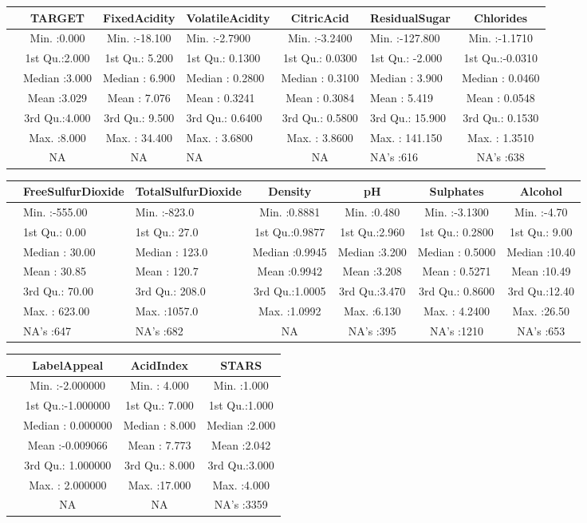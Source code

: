 \documentclass[]{article}
\begin{document}
\begin{longtable}[]{@{}lcclclc@{}}
\toprule
& TARGET & FixedAcidity & VolatileAcidity & CitricAcid & ResidualSugar &
Chlorides\tabularnewline
\midrule
\endhead
& Min. :0.000 & Min. :-18.100 & Min. :-2.7900 & Min. :-3.2400 & Min.
:-127.800 & Min. :-1.1710\tabularnewline
& 1st Qu.:2.000 & 1st Qu.: 5.200 & 1st Qu.: 0.1300 & 1st Qu.: 0.0300 &
1st Qu.: -2.000 & 1st Qu.:-0.0310\tabularnewline
& Median :3.000 & Median : 6.900 & Median : 0.2800 & Median : 0.3100 &
Median : 3.900 & Median : 0.0460\tabularnewline
& Mean :3.029 & Mean : 7.076 & Mean : 0.3241 & Mean : 0.3084 & Mean :
5.419 & Mean : 0.0548\tabularnewline
& 3rd Qu.:4.000 & 3rd Qu.: 9.500 & 3rd Qu.: 0.6400 & 3rd Qu.: 0.5800 &
3rd Qu.: 15.900 & 3rd Qu.: 0.1530\tabularnewline
& Max. :8.000 & Max. : 34.400 & Max. : 3.6800 & Max. : 3.8600 & Max. :
141.150 & Max. : 1.3510\tabularnewline
& NA & NA & NA & NA & NA's :616 & NA's :638\tabularnewline
\bottomrule
\end{longtable}

\begin{longtable}[]{@{}lllcccc@{}}
\toprule
& FreeSulfurDioxide & TotalSulfurDioxide & Density & pH & Sulphates &
Alcohol\tabularnewline
\midrule
\endhead
& Min. :-555.00 & Min. :-823.0 & Min. :0.8881 & Min. :0.480 & Min.
:-3.1300 & Min. :-4.70\tabularnewline
& 1st Qu.: 0.00 & 1st Qu.: 27.0 & 1st Qu.:0.9877 & 1st Qu.:2.960 & 1st
Qu.: 0.2800 & 1st Qu.: 9.00\tabularnewline
& Median : 30.00 & Median : 123.0 & Median :0.9945 & Median :3.200 &
Median : 0.5000 & Median :10.40\tabularnewline
& Mean : 30.85 & Mean : 120.7 & Mean :0.9942 & Mean :3.208 & Mean :
0.5271 & Mean :10.49\tabularnewline
& 3rd Qu.: 70.00 & 3rd Qu.: 208.0 & 3rd Qu.:1.0005 & 3rd Qu.:3.470 & 3rd
Qu.: 0.8600 & 3rd Qu.:12.40\tabularnewline
& Max. : 623.00 & Max. :1057.0 & Max. :1.0992 & Max. :6.130 & Max. :
4.2400 & Max. :26.50\tabularnewline
& NA's :647 & NA's :682 & NA & NA's :395 & NA's :1210 & NA's
:653\tabularnewline
\bottomrule
\end{longtable}

\begin{longtable}[]{@{}lccc@{}}
\toprule
& LabelAppeal & AcidIndex & STARS\tabularnewline
\midrule
\endhead
& Min. :-2.000000 & Min. : 4.000 & Min. :1.000\tabularnewline
& 1st Qu.:-1.000000 & 1st Qu.: 7.000 & 1st Qu.:1.000\tabularnewline
& Median : 0.000000 & Median : 8.000 & Median :2.000\tabularnewline
& Mean :-0.009066 & Mean : 7.773 & Mean :2.042\tabularnewline
& 3rd Qu.: 1.000000 & 3rd Qu.: 8.000 & 3rd Qu.:3.000\tabularnewline
& Max. : 2.000000 & Max. :17.000 & Max. :4.000\tabularnewline
& NA & NA & NA's :3359\tabularnewline
\bottomrule
\end{longtable}
\end{document}
